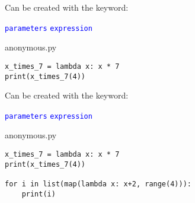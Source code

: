 \documentclass[aspectratio=1610,slidestop]{beamer}
\newcommand{\decl}[1]{\textcolor{blue}{\lstinline{#1}}}
\begin{document}
\begin{pframe}
 Can be created with the  keyword:
 \begin{pythondeclaration}
  \textvisiblespace\decl{parameters}\emp{:}\textvisiblespace
  \decl{expression}
 \end{pythondeclaration}
 \bigskip

 \begin{minipage}[t]{0.47\textwidth}
  \begin{pythonfile}{anonymous.py}
   \begin{verbatim}
x_times_7 = lambda x: x * 7
print(x_times_7(4))
   \end{verbatim}
  \end{pythonfile}
 \end{minipage}\qquad
 \pause
 \begin{minipage}[t]{0.47\textwidth}
 \begin{terminal}
 \end{terminal}
 \end{minipage}
\end{pframe}


\begin{pframe}
 Can be created with the  keyword:
 \begin{pythondeclaration}
  \textvisiblespace\decl{parameters}\emp{:}\textvisiblespace
  \decl{expression}
 \end{pythondeclaration}
 \bigskip

 \begin{minipage}[t]{0.60\textwidth}
 \vspace{-3.25cm}
  \begin{pythonfile}{anonymous.py}
   \begin{verbatim}
x_times_7 = lambda x: x * 7
print(x_times_7(4))

for i in list(map(lambda x: x+2, range(4))):
    print(i)
   \end{verbatim}
  \end{pythonfile}
 \end{minipage}\qquad
 \pause
 \begin{minipage}[t]{0.35\textwidth}
 \begin{terminal}
 \end{terminal}
 \end{minipage}
\end{pframe}
\end{document}
